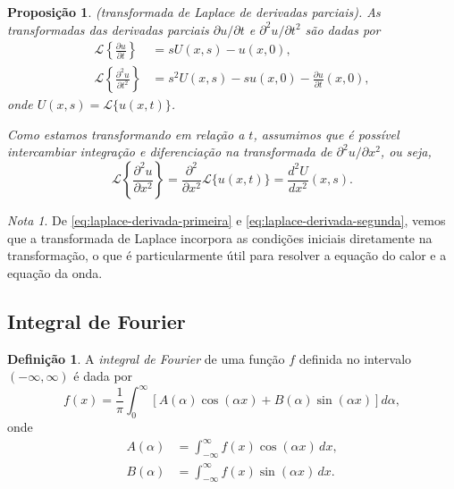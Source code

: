 \documentclass{article}
\theoremstyle{plain}
\newtheorem{prop}[thm]{Proposição}
\theoremstyle{definition}
\newtheorem{defn}{Definição}[section]
\theoremstyle{remark}
\newtheorem*{rem}{Nota}
\begin{document}
\begin{prop} (transformada de Laplace de derivadas parciais).
    As transformadas das derivadas parciais \(\partial u/\partial t\) e \(\partial^2 u/\partial t^2\) são dadas por
    \begin{align}
        \mathcal{L}\left\{\frac{\partial u}{\partial t}\right\} &= s U(x,s) - u(x,0), \label{eq:laplace-derivada-primeira} \\
        \mathcal{L}\left\{\frac{\partial^2 u}{\partial t^2}\right\} &= s^2 U(x,s) - s u(x,0) - \frac{\partial u}{\partial t}(x,0), \label{eq:laplace-derivada-segunda}
    \end{align}
    \noindent onde \(U(x,s) = \mathcal{L}\{u(x,t)\}\).

    Como estamos transformando em relação a \(t\), assumimos que é possível intercambiar integração e diferenciação na transformada de \(\partial^2u/\partial x^2\), ou seja,
    \begin{equation}
        \mathcal{L}\left\{\frac{\partial^2 u}{\partial x^2}\right\} = \frac{\partial^2}{\partial x^2} \mathcal{L}\{u(x,t)\} = \frac{d^2 U}{d x^2}(x,s).
    \end{equation}
\end{prop}

\begin{rem}
    De \eqref{eq:laplace-derivada-primeira} e \eqref{eq:laplace-derivada-segunda}, vemos que a transformada de Laplace incorpora as condições iniciais diretamente na transformação, o que é particularmente útil para resolver a equação do calor e a equação da onda.
\end{rem}

\subsection{Integral de Fourier}

\begin{defn}
    A \emph{integral de Fourier} de uma função \(f\) definida no intervalo \(\left(-\infty, \infty\right)\) é dada por
    \begin{equation}\label{eq:integral-fourier}
        f(x) = \frac{1}{\pi} \int_{0}^{\infty} \left[A(\alpha) \cos(\alpha x) + B(\alpha) \sin(\alpha x)\right] d\alpha,
    \end{equation}
    \noindent onde
    \begin{align}
        A(\alpha) &= \int_{-\infty}^{\infty} f(x) \cos(\alpha x) \, dx, \\
        B(\alpha) &= \int_{-\infty}^{\infty} f(x) \sin(\alpha x) \, dx.
    \end{align}
\end{defn}
\end{document}
